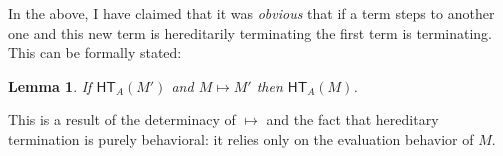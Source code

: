 \documentclass{article}
\newtheorem{lem}[thm]{Lemma}
\newcommand{\hterm}[2]{\ensuremath{\mathsf{HT}_{#1}(#2)}}
\newcommand{\step}[2]{\ensuremath{#1 \mapsto #2}}
\begin{document}
In the above, I have claimed that it was \emph{obvious} that if a term
steps to another one and this new term is hereditarily terminating
the first term is terminating. This can be formally stated:
\begin{lem}
  If $\hterm{A}{M'}$ and $\step{M}{M'}$ then $\hterm{A}{M}$.
\end{lem}
This is a result of the determinacy of $\mapsto$ and the fact that
hereditary termination is purely behavioral: it relies only on the
evaluation behavior of $M$.



\end{document}
